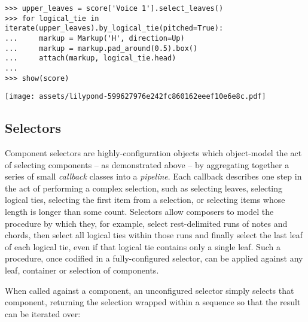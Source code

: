 \begin{comment}
<abjad>
upper_leaves = score['Voice 1'].select_leaves()
for logical_tie in iterate(upper_leaves).by_logical_tie(pitched=True):
    markup = Markup('H', direction=Up)
    markup = markup.pad_around(0.5).box()
    attach(markup, logical_tie.head)

show(score)
</abjad>
\end{comment}

\begin{abjadbookoutput}
\begin{singlespacing}
\vspace{-0.5\baselineskip}
\begin{verbatim}
>>> upper_leaves = score['Voice 1'].select_leaves()
>>> for logical_tie in iterate(upper_leaves).by_logical_tie(pitched=True):
...     markup = Markup('H', direction=Up)
...     markup = markup.pad_around(0.5).box()
...     attach(markup, logical_tie.head)
...
>>> show(score)
\end{verbatim}
\noindent\texttt{[image: assets/lilypond-599627976e242fc860162eeef10e6e8c.pdf]}
\end{singlespacing}
\end{abjadbookoutput}

\subsection{Selectors}
\label{ssec:selectors}

Component selectors are highly-configuration objects which object-model the act
of selecting components -- as demonstrated above -- by aggregating together a
series of small \emph{callback} classes into a \emph{pipeline}. Each callback
describes one step in the act of performing a complex selection, such as
selecting leaves, selecting logical ties, selecting the first item from a
selection, or selecting items whose length is longer than some count. Selectors
allow composers to model the procedure by which they, for example, select
rest-delimited runs of notes and chords, then select all logical ties within
those runs and finally select the last leaf of each logical tie, even if that
logical tie contains only a single leaf. Such a procedure, once codified in a
fully-configured selector, can be applied against any leaf, container or
selection of components.

When called against a component, an unconfigured selector simply selects that
component, returning the selection wrapped within a sequence so that the result
can be iterated over:

